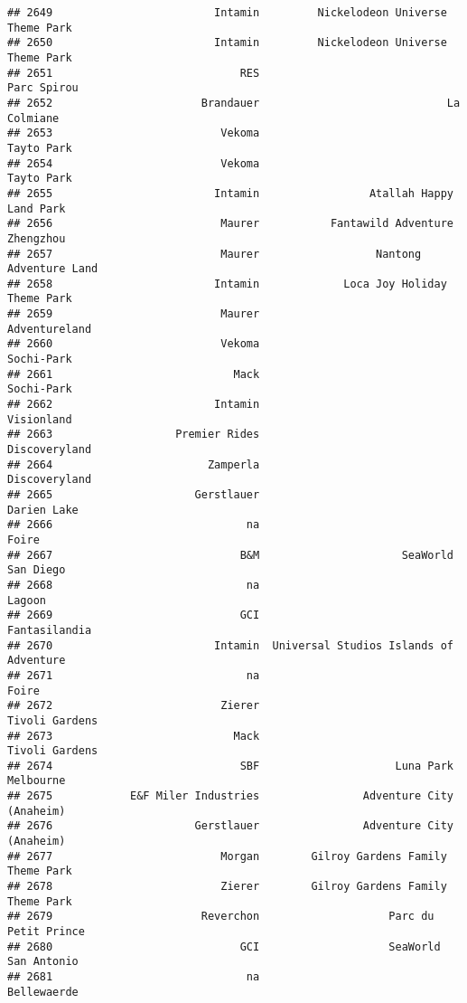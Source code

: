\documentclass[
]{article}
\begin{document}
\begin{verbatim}
## 2649                         Intamin         Nickelodeon Universe Theme Park
## 2650                         Intamin         Nickelodeon Universe Theme Park
## 2651                             RES                             Parc Spirou
## 2652                       Brandauer                             La Colmiane
## 2653                          Vekoma                              Tayto Park
## 2654                          Vekoma                              Tayto Park
## 2655                         Intamin                 Atallah Happy Land Park
## 2656                          Maurer           Fantawild Adventure Zhengzhou
## 2657                          Maurer                  Nantong Adventure Land
## 2658                         Intamin             Loca Joy Holiday Theme Park
## 2659                          Maurer                           Adventureland
## 2660                          Vekoma                              Sochi-Park
## 2661                            Mack                              Sochi-Park
## 2662                         Intamin                              Visionland
## 2663                   Premier Rides                           Discoveryland
## 2664                        Zamperla                           Discoveryland
## 2665                      Gerstlauer                             Darien Lake
## 2666                              na                                   Foire
## 2667                             B&M                      SeaWorld San Diego
## 2668                              na                                  Lagoon
## 2669                             GCI                           Fantasilandia
## 2670                         Intamin  Universal Studios Islands of Adventure
## 2671                              na                                   Foire
## 2672                          Zierer                          Tivoli Gardens
## 2673                            Mack                          Tivoli Gardens
## 2674                             SBF                     Luna Park Melbourne
## 2675            E&F Miler Industries                Adventure City (Anaheim)
## 2676                      Gerstlauer                Adventure City (Anaheim)
## 2677                          Morgan        Gilroy Gardens Family Theme Park
## 2678                          Zierer        Gilroy Gardens Family Theme Park
## 2679                       Reverchon                    Parc du Petit Prince
## 2680                             GCI                    SeaWorld San Antonio
## 2681                              na                             Bellewaerde

\end{verbatim}
\end{document}
